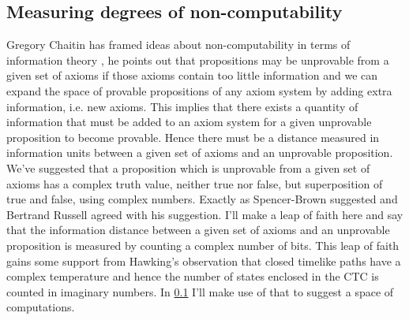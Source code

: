 \subsection{Measuring degrees of non-computability}
\label{sec:measuring-non-computability}
Gregory Chaitin has framed ideas about non-computability in terms of information theory
\autocite{Chaitin1987AlgorithmicTheory}, he points out that propositions may be unprovable from
a given set of axioms if those axioms contain too little information and we can expand the space
of provable propositions of any axiom system by adding extra information, i.e. new axioms. This
implies that there exists a quantity of information that must be added to an axiom system for a
given unprovable proposition to become provable. Hence there must be a distance measured in
information units between a given set of axioms and an unprovable proposition. We've suggested
that a proposition which is unprovable from a given set of axioms has a complex truth value,
neither true nor false, but superposition of true and false, using complex numbers. Exactly as
Spencer-Brown suggested and Bertrand Russell agreed with his suggestion. I'll make a leap of
faith here and say that the information distance between a given set of axioms and an unprovable
proposition is measured by counting a complex number of bits. This leap of faith gains some
support from Hawking's observation that closed timelike paths have a complex temperature
\autocite{Hawking1995QuantumCurves} and hence the number of states enclosed in the CTC is
counted in imaginary numbers. In \ref{sec:measuring-non-computability} I'll make use of that to
suggest a space of computations.

